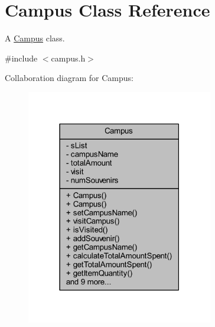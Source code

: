 \hypertarget{class_campus}{}\section{Campus Class Reference}
\label{class_campus}


A \hyperlink{class_campus}{Campus} class.  




{\ttfamily \#include $<$campus.\+h$>$}



Collaboration diagram for Campus\+:
\nopagebreak
\begin{figure}[H]
\begin{center}
\leavevmode
\includegraphics[width=231pt]{class_campus__coll__graph}
\end{center}
\end{figure}
